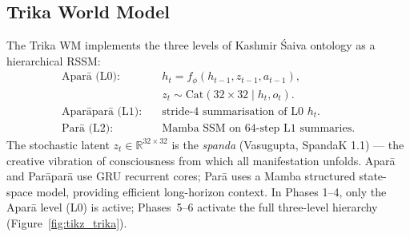 \documentclass[journal,onecolumn,11pt]{IEEEtran}
\begin{document}
\subsection{Trika World Model}

The Trika WM implements the three levels of Kashmir Śaiva ontology as a
hierarchical RSSM:
%
\begin{align}
  \text{Aparā (L0):}    & \quad h_t = f_\phi(h_{t-1}, z_{t-1}, a_{t-1}), \nonumber\\
                         & \quad z_t \sim \text{Cat}(32 \times 32 \mid h_t, o_t). \\
  \text{Aparāparā (L1):}& \quad \text{stride-4 summarisation of L0 } h_t. \\
  \text{Parā (L2):}      & \quad \text{Mamba SSM on 64-step L1 summaries.}
\end{align}
%
The stochastic latent $z_t \in \mathbb{R}^{32 \times 32}$ is the
\emph{spanda} (Vasugupta, SpandaK 1.1) — the creative vibration of
consciousness from which all manifestation unfolds.
Aparā and Parāparā use GRU recurrent cores; Parā uses a Mamba
structured state-space model, providing efficient long-horizon context.
In Phases 1--4, only the Aparā level (L0) is active; Phases~5--6 activate
the full three-level hierarchy (Figure~\ref{fig:tikz_trika}).
\end{document}
